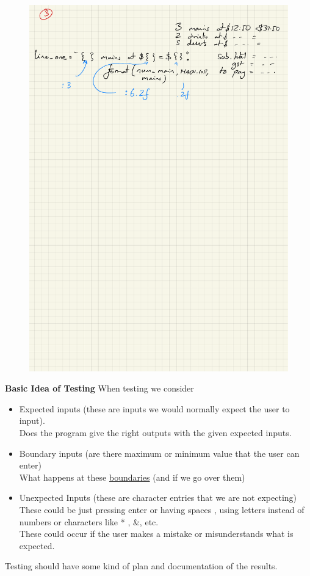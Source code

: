\documentclass[a4paper,12pt]{article}
\begin{document}
\begin{figure} [!h]
	\centering
	\includegraphics[width=12cm]{iterative_processes/simple_planning_2.pdf}
\end{figure}
\newpage
\textbf{Basic Idea of Testing}
When testing we consider
\begin{itemize}
	\item Expected inputs (these are inputs we would normally expect the user to input).\\
	Does the program give the right outputs with the given expected inputs.
	\item Boundary inputs (are there maximum or minimum value that the user can enter)\\
	What happens at these \underline{boundaries} (and if we go over them)
	\item Unexpected Inputs  (these are character entries that we are not expecting)\\
	These could be just pressing enter or having spaces , using letters instead of numbers or characters like * , \&, etc.\\
	These could occur if the user makes a mistake or misunderstands what is expected.
\end{itemize}
Testing should have some kind of plan and documentation of the results.\\
\end{document}
